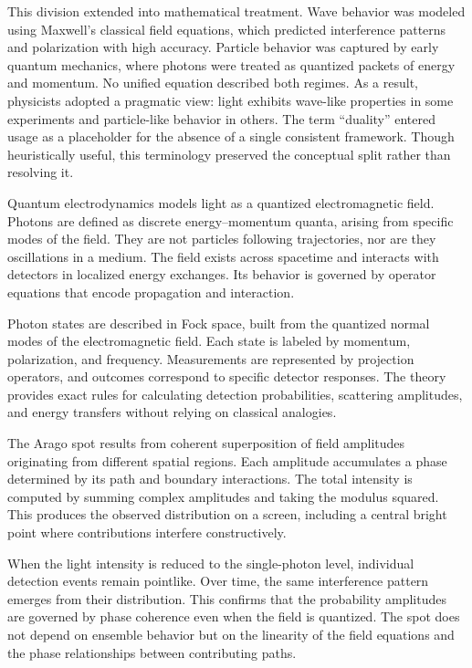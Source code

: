 This division extended into mathematical treatment. Wave behavior was modeled using Maxwell’s classical field equations, which predicted interference patterns and polarization with high accuracy. Particle behavior was captured by early quantum mechanics, where photons were treated as quantized packets of energy and momentum. No unified equation described both regimes. As a result, physicists adopted a pragmatic view: light exhibits wave-like properties in some experiments and particle-like behavior in others. The term “duality” entered usage as a placeholder for the absence of a single consistent framework. Though heuristically useful, this terminology preserved the conceptual split rather than resolving it.

Quantum electrodynamics models light as a quantized electromagnetic field. Photons are defined as discrete energy–momentum quanta, arising from specific modes of the field. They are not particles following trajectories, nor are they oscillations in a medium. The field exists across spacetime and interacts with detectors in localized energy exchanges. Its behavior is governed by operator equations that encode propagation and interaction.

Photon states are described in Fock space, built from the quantized normal modes of the electromagnetic field. Each state is labeled by momentum, polarization, and frequency. Measurements are represented by projection operators, and outcomes correspond to specific detector responses. The theory provides exact rules for calculating detection probabilities, scattering amplitudes, and energy transfers without relying on classical analogies.

The Arago spot results from coherent superposition of field amplitudes originating from different spatial regions. Each amplitude accumulates a phase determined by its path and boundary interactions. The total intensity is computed by summing complex amplitudes and taking the modulus squared. This produces the observed distribution on a screen, including a central bright point where contributions interfere constructively.

When the light intensity is reduced to the single-photon level, individual detection events remain pointlike. Over time, the same interference pattern emerges from their distribution. This confirms that the probability amplitudes are governed by phase coherence even when the field is quantized. The spot does not depend on ensemble behavior but on the linearity of the field equations and the phase relationships between contributing paths.

